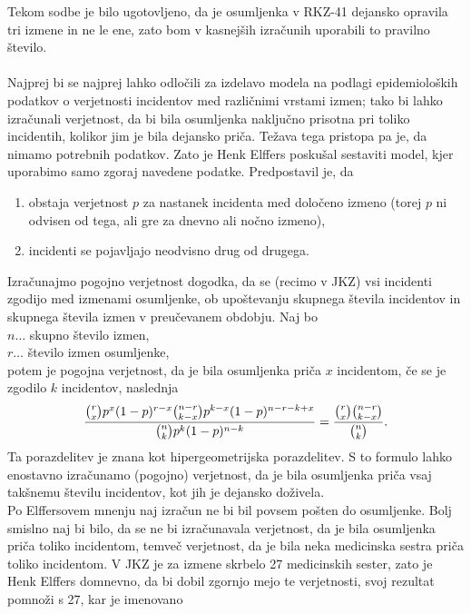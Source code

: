 \documentclass[12pt,a4paper]{amsart}
\theoremstyle{definition} %
\theoremstyle{plain} %
\begin{document}
Tekom sodbe je bilo ugotovljeno, da je osumljenka v RKZ-41 dejansko opravila tri izmene in ne le ene, zato bom v kasnejših izračunih uporabili to 
pravilno število.\\\\
Najprej bi se najprej lahko odločili za izdelavo modela na podlagi epidemioloških podatkov o verjetnosti incidentov med različnimi vrstami izmen; 
tako bi lahko izračunali verjetnost, da bi bila osumljenka naključno prisotna pri toliko incidentih, kolikor jim je bila dejansko priča. Težava 
tega pristopa pa je, da nimamo potrebnih podatkov. Zato je Henk Elffers poskušal sestaviti model, kjer uporabimo samo zgoraj navedene podatke. Predpostavil 
je, da
\begin{enumerate}
    \item obstaja verjetnost $p$ za nastanek incidenta med določeno izmeno (torej $p$ ni odvisen od tega, ali gre za dnevno ali nočno izmeno),
    \item incidenti se pojavljajo neodvisno drug od drugega.
\end{enumerate}
Izračunajmo pogojno verjetnost dogodka, da se (recimo v JKZ) vsi incidenti zgodijo med izmenami osumljenke, ob upoštevanju skupnega števila 
incidentov in skupnega števila izmen v preučevanem obdobju. Naj bo\\
$n \dots$ skupno število izmen,\\
$r \dots$ število izmen osumljenke, \\
potem je pogojna verjetnost, da je bila osumljenka priča $x$ incidentom, če se je zgodilo $k$ incidentov, naslednja
\begin{equation}\label{eq:l_pogojna}
    \frac{\binom{r}{x}p^x(1-p)^{r-x}\binom{n-r}{k-x}p^{k-x}(1-p)^{n-r-k+x}}{\binom{n}{k}p^k(1-p)^{n-k}} = \frac{\binom{r}{x}\binom{n-r}{k-x}}{\binom{n}{k}}.\vspace{2mm}
\end{equation}
Ta porazdelitev je znana kot hipergeometrijska porazdelitev. S to formulo lahko enostavno izračunamo (pogojno) verjetnost, da je bila osumljenka 
priča vsaj takšnemu številu incidentov, kot jih je dejansko doživela.\\
Po Elffersovem mnenju naj izračun ne bi bil povsem pošten do osumljenke. Bolj smislno naj bi bilo, da se ne bi izračunavala verjetnost, da je 
bila osumljenka priča toliko incidentom, temveč verjetnost, da je bila neka medicinska sestra priča toliko incidentom. V JKZ je za izmene skrbelo 
27 medicinskih sester, zato je Henk Elffers domnevno, da bi dobil zgornjo mejo te verjetnosti, svoj rezultat pomnoži s 27, kar je imenovano 
\end{document}
